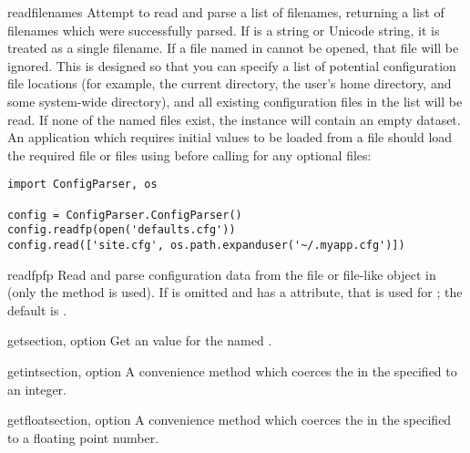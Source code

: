 \begin{methoddesc}{read}{filenames}
Attempt to read and parse a list of filenames, returning a list of filenames
which were successfully parsed.  If  is a string or
Unicode string, it is treated as a single filename.
If a file named in  cannot be opened, that file will be
ignored.  This is designed so that you can specify a list of potential
configuration file locations (for example, the current directory, the
user's home directory, and some system-wide directory), and all
existing configuration files in the list will be read.  If none of the
named files exist, the  instance will contain an
empty dataset.  An application which requires initial values to be
loaded from a file should load the required file or files using
 before calling  for any optional
files:

\begin{verbatim}
import ConfigParser, os

config = ConfigParser.ConfigParser()
config.readfp(open('defaults.cfg'))
config.read(['site.cfg', os.path.expanduser('~/.myapp.cfg')])
\end{verbatim}
\end{methoddesc}

\begin{methoddesc}{readfp}{fp}
Read and parse configuration data from the file or file-like object in
 (only the  method is used).  If
 is omitted and  has a  attribute,
that is used for ; the default is .
\end{methoddesc}

\begin{methoddesc}{get}{section, option}
Get an  value for the named .
\end{methoddesc}

\begin{methoddesc}{getint}{section, option}
A convenience method which coerces the  in the specified
 to an integer.
\end{methoddesc}

\begin{methoddesc}{getfloat}{section, option}
A convenience method which coerces the  in the specified
 to a floating point number.
\end{methoddesc}

